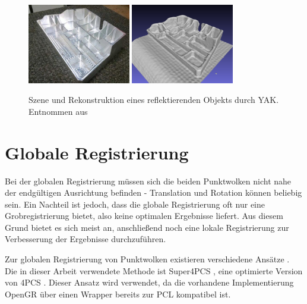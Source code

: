 \begin{figure}[ht]
	\centering
	\includegraphics[width=0.4\textwidth]{images/yak-reflecting-scene.jpg}
	\includegraphics[width=0.4\textwidth]{images/yak-reflecting-reconstruction.png}
	\caption{Szene und Rekonstruktion eines reflektierenden Objekts durch \ac{YAK}. Entnommen aus \cite{schornak2019yak}}
	\label{fig:yak-reflecting-model}
\end{figure}


\section{Globale Registrierung}
\label{sec:global-registration}

Bei der globalen Registrierung müssen sich die beiden Punktwolken nicht nahe der endgültigen Ausrichtung befinden - Translation und Rotation können beliebig sein.
Ein Nachteil ist jedoch, dass die globale Registrierung oft nur eine Grobregistrierung bietet, also keine optimalen Ergebnisse liefert.
Aus diesem Grund bietet es sich meist an, anschließend noch eine lokale Registrierung zur Verbesserung der Ergebnisse durchzuführen.

Zur globalen Registrierung von Punktwolken existieren verschiedene Ansätze \cite{chaudhury2015global, zhou2016fast, rusu2009fast}.
Die in dieser Arbeit verwendete Methode ist Super4PCS \cite{mellado2014super4pcs}, eine optimierte Version von \ac{4PCS} \cite{aiger2008fpcs}.
Dieser Ansatz wird verwendet, da die vorhandene Implementierung \ac{OpenGR} \cite{mellado2018opengr} über einen Wrapper bereits zur \ac{PCL} kompatibel ist.




